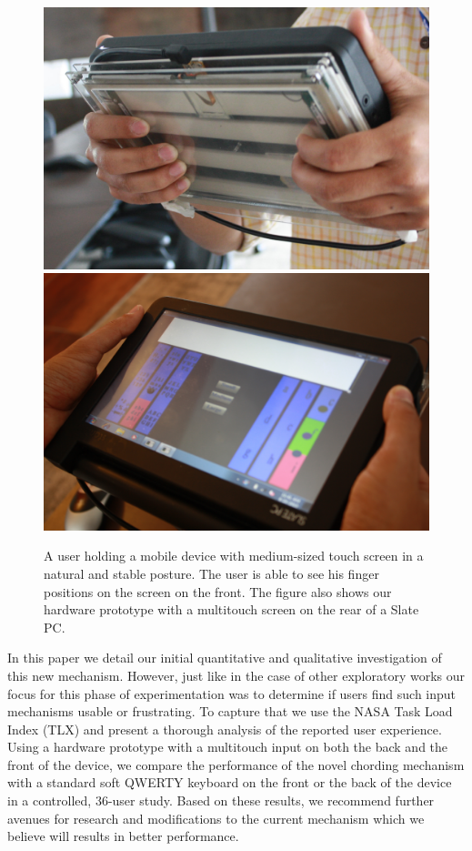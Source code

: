 \begin{figure}
    \includegraphics[scale=0.43]{Figures/natural1.pdf} 
     \includegraphics[scale=0.43]{Figures/natural2.pdf} 
     \caption{A user holding a mobile device with medium-sized touch
       screen in a natural and stable posture. The user is able to see
       his finger positions on the screen on the front. The figure
       also shows our hardware prototype with a multitouch screen on
       the rear of a Slate PC.}
        \label{fig:natural}
\end{figure}

In this paper we detail our initial quantitative and qualitative investigation of this new mechanism. However, just like in the case of other exploratory works  our focus for this phase of experimentation was to determine if users find such input mechanisms usable or frustrating. To capture that we use the NASA Task Load Index (TLX) and present a thorough analysis of the reported user experience. Using a hardware prototype with a multitouch input on both the back and the front of the device, we compare the performance of the novel chording mechanism with a standard soft QWERTY keyboard on the front or the back of the device in a controlled, 36-user study.  Based on these results, we recommend further avenues for research and modifications to the current mechanism which we believe will results in better performance.
